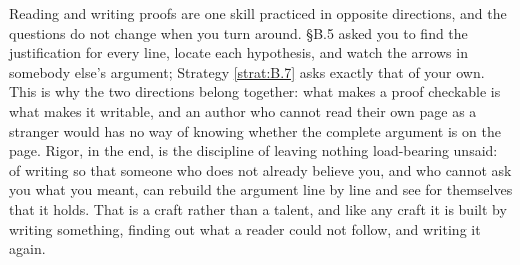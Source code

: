 \documentclass[a4paper,12pt,oneside]{memoir}
\begin{document}
Reading and writing proofs are one skill practiced in opposite directions, and the questions do not change when you turn around. §B.5 asked you to find the justification for every line, locate each hypothesis, and watch the arrows in somebody else’s argument; Strategy \ref{strat:B.7} asks exactly that of your own. This is why the two directions belong together: what makes a proof checkable is what makes it writable, and an author who cannot read their own page as a stranger would has no way of knowing whether the complete argument is on the page. Rigor, in the end, is the discipline of leaving nothing load-bearing unsaid: of writing so that someone who does not already believe you, and who cannot ask you what you meant, can rebuild the argument line by line and see for themselves that it holds. That is a craft rather than a talent, and like any craft it is built by writing something, finding out what a reader could not follow, and writing it again.
\end{document}

